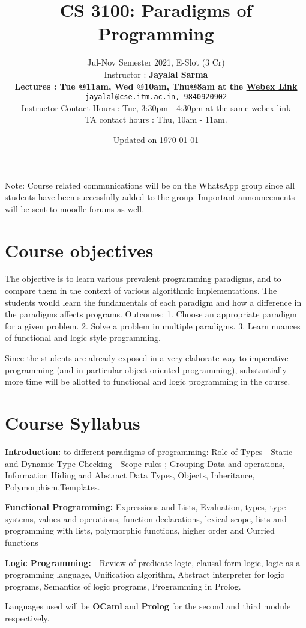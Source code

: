 \documentclass[10pt]{article}
\title{CS 3100: Paradigms of Programming}
\author{Jul-Nov Semester 2021, E-Slot (3 Cr)\\[2mm]
Instructor : \textbf{Jayalal Sarma} \\[2mm]
\textbf{Lectures : Tue @11am, Wed @10am, Thu@8am at the \href{https://iitmadras.webex.com/meet/jayalal}{Webex Link}} \\[2mm]
\texttt{jayalal@cse.itm.ac.in, 9840920902}\\[2mm]
Instructor Contact Hours : Tue, 3:30pm - 4:30pm at the same webex link\\
TA contact hours : Thu, 10am - 11am.
}
\date{Updated on \today}
\begin{document}
\maketitle

\noindent Note: Course related communications will be on the WhatsApp group since all students have been successfully added to the group. Important announcements will be sent to moodle forums as well.

\section{Course objectives}
The objective is to learn various prevalent programming paradigms, and to compare them in the context of various algorithmic implementations. The
students would learn the fundamentals of each paradigm and how a difference in the paradigms affects programs. Outcomes: 1. Choose an appropriate paradigm for a given problem. 2. Solve a problem in multiple paradigms. 3. Learn nuances of functional and logic style programming.

Since the students are already exposed in a very elaborate way to imperative programming (and in particular object oriented programming), substantially more time will be allotted to functional and logic programming in the course. 

\section{Course Syllabus}
\begin{description}
\item\textbf{Introduction:} to different paradigms of programming: Role of Types - Static and Dynamic Type Checking - Scope rules ; Grouping Data and operations, Information Hiding and Abstract Data Types, Objects, Inheritance, Polymorphism,Templates.
\item\textbf{Functional Programming:} Expressions and Lists, Evaluation, types, type systems, values and operations, function declarations, lexical scope, lists and programming with lists, polymorphic functions, higher order and Curried functions
\item\textbf{Logic Programming:} - Review of predicate logic, clausal-form logic, logic as a programming language, Unification algorithm, Abstract interpreter for logic programs, Semantics of logic programs, Programming in Prolog.
\end{description}

\noindent Languages used will be {\bf OCaml} and {\bf Prolog} for the second and third module respectively.
\end{document}
